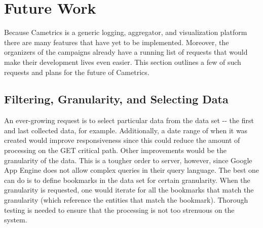 \documentclass[10pt,a4paper,english]{article}
\begin{document}
\pagebreak{}




\hypertarget{future-work}{}
\section*{Future Work}
\label{future-work}

Because Cametrics is a generic logging, aggregator, and visualization platform there are many features that have yet to be implemented. Moreover, the organizers of the campaigns already have a running list of requests that would make their development lives even easier. This section outlines a few of such requests and plans for the future of Cametrics.



\hypertarget{filtering-granularity-and-selecting-data}{}
\subsection*{Filtering, Granularity, and Selecting Data}
\label{filtering-granularity-and-selecting-data}

An ever-growing request is to select particular data from the data set -{}- the first and last collected data, for example. Additionally, a date range of when it was created would improve responsiveness since this could reduce the amount of processing on the GET critical path. Other improvements would be the granularity of the data. This is a tougher order to server, however, since Google App Engine does not allow complex queries in their query language. The best one can do is to define bookmarks in the data set for certain granularity. When the granularity is requested, one would iterate for all the bookmarks that match the granularity (which reference the entities that match the bookmark). Thorough testing is needed to ensure that the processing is not too strenuous on the system.



\hypertarget{summaries-of-summaries}{}
\end{document}
